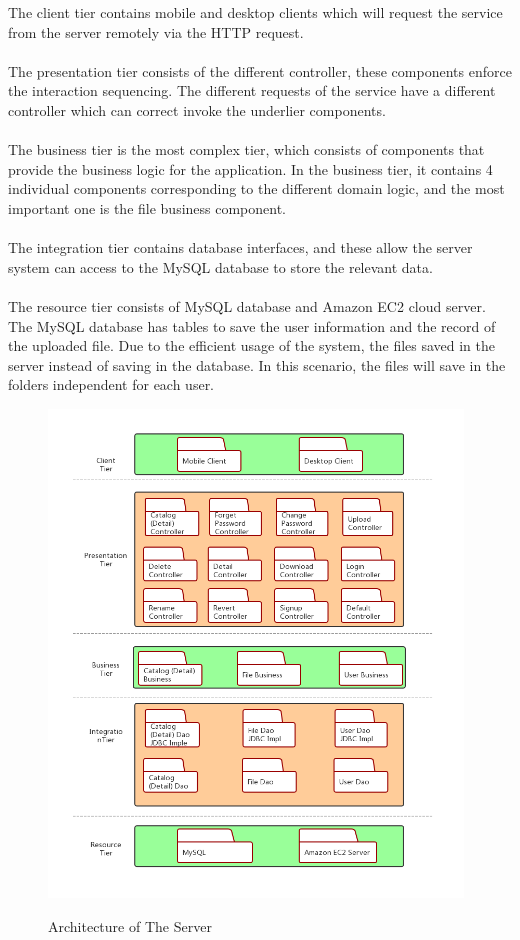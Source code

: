 \documentclass[11pt]{article}
\begin{document}
The client tier contains mobile and desktop clients which will request the service from the server remotely via the HTTP request.
\\
\\
The presentation tier consists of the different controller, these components enforce the interaction sequencing. The different requests of the service have a different controller which can correct invoke the underlier components. 
\\
\\
The business tier is the most complex tier, which consists of components that provide the business logic for the application. In the business tier, it contains 4 individual components corresponding to the different domain logic, and the most important one is the file business component.
\\
\\
The integration tier contains database interfaces, and these allow the server system can access to the MySQL database to store the relevant data.
\\
\\
The resource tier consists of MySQL database and Amazon EC2 cloud server. The MySQL database has tables to save the user information and the record of the uploaded file. Due to the efficient usage of the system, the files saved in the server instead of saving in the database. In this scenario, the files will save in the folders independent for each user.

\begin{figure}[htbp]
	\centering
	\includegraphics[width=11cm]{10.png}\\
	\caption{Architecture of The Server}
\end{figure}
\end{document}
